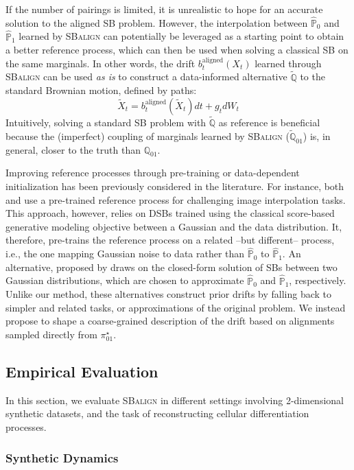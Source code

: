 If the number of pairings is limited,  it is unrealistic to hope for an accurate solution to the aligned SB problem. However, the interpolation between $\hat{\mathbb{P}}_0$ and $\hat{\mathbb{P}}_1$ learned by \textsc{SBalign} can potentially be leveraged as a starting point to obtain a better reference process, which can then be used when solving a classical SB on the same marginals. In other words, the drift $b^\text{aligned}_t(X_t)$ learned through \textsc{SBalign} can be used \textit{as is} to construct a data-informed alternative $\tilde{\mathbb{Q}}$ to the standard Brownian motion, defined by paths:
\[
    \tilde{X}_t = b^\text{aligned}_t(\tilde{X}_t) dt + g_t dW_t
\]
Intuitively, solving a standard SB problem with $\tilde{\mathbb{Q}}$ as reference is beneficial because the (imperfect) coupling of marginals learned by \textsc{SBalign} ($\tilde{\mathbb{Q}}_{01}$) is, in general, closer to the truth than $\mathbb{Q}_{01}$.

Improving reference processes through pre-training or data-dependent initialization has been previously considered in the literature. For instance, both \citet{de2021diffusion} and \citet{chen2021likelihood} use a pre-trained reference process for challenging image interpolation tasks. This approach, however, relies on DSBs trained using the classical score-based generative modeling objective between a Gaussian and the data distribution. It, therefore, pre-trains the reference process on a related --but different-- process, i.e., the one mapping Gaussian noise to data rather than $\hat{\mathbb{P}}_0$ to $\hat{\mathbb{P}}_1$.
An alternative, proposed by \citet{bunne2022recovering} draws on the closed-form solution of SBs between two Gaussian distributions, which are chosen to approximate $\hat{\mathbb{P}}_0$ and $\hat{\mathbb{P}}_1$, respectively.
Unlike our method, these alternatives construct prior drifts by falling back to simpler and related tasks, or approximations of the original problem. We instead propose to shape a coarse-grained description of the drift based on alignments sampled directly from $\pi^\star_{01}$. 

\subsection{Empirical Evaluation}
In this section, we evaluate \textsc{SBalign} in different settings involving 2-dimensional synthetic datasets, and the task of reconstructing cellular differentiation processes.

\subsubsection{Synthetic Dynamics}
\label{sec:sbalign_synthetic}

